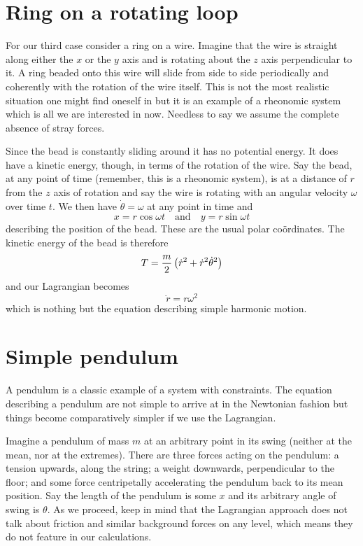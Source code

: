 \documentclass[english,seminar,headertitle]{lecture}
\begin{document}
\section{Ring on a rotating loop}

For our third case consider a ring on a wire. Imagine that the wire is straight along either the $x$ or the $y$ axis and is rotating about the $z$ axis perpendicular to it. A ring beaded onto this wire will slide from side to side periodically and coherently with the rotation of the wire itself. This is not the most realistic situation one might find oneself in but it is an example of a rheonomic system which is all we are interested in now. Needless to say we assume the complete absence of stray forces.

Since the bead is constantly sliding around it has no potential energy. It does have a kinetic energy, though, in terms of the rotation of the wire. Say the bead, at any point of time (remember, this is a rheonomic system), is at a distance of $r$ from the $z$ axis of rotation and say the wire is rotating with an angular velocity $\omega$ over time $t$. We then have $\dot{\theta} = \omega$ at any point in time and
$$
x = r \cos \omega t \quad \textrm{and} \quad y = r \sin \omega t
$$
describing the position of the bead. These are the usual polar co\"{o}rdinates. The kinetic energy of the bead is therefore
\begin{equation}
	T = {m \over 2} \left( \dot{r}^2 + \dot{r}^2 \dot{\theta}^2 \right)
	\label{eq:T-ring}
\end{equation}%
and our Lagrangian becomes
\begin{equation}
	\ddot{r} = r\omega^2
	\label{eq:ring-result}
\end{equation}%
which is nothing but the equation describing simple harmonic motion.

\section{Simple pendulum}

A pendulum is a classic example of a system with constraints. The equation describing a pendulum are not simple to arrive at in the Newtonian fashion but things become comparatively simpler if we use the Lagrangian.

Imagine a pendulum of mass $m$ at an arbitrary point in its swing (neither at the mean, nor at the extremes). There are three forces acting on the pendulum: a tension upwards, along the string; a weight downwards, perpendicular to the floor; and some force centripetally accelerating the pendulum back to its mean position. Say the length of the pendulum is some $x$ and its arbitrary angle of swing is $\theta$. As we proceed, keep in mind that the Lagrangian approach does not talk about friction and similar background forces on any level, which means they do not feature in our calculations.
\end{document}
